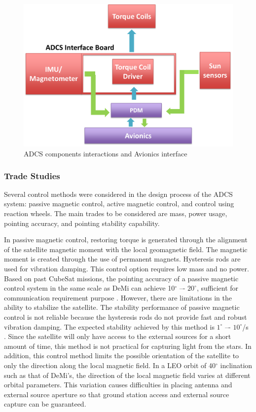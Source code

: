 \documentclass[12pt]{article}
\begin{document}
			\begin{figure}[!ht]
				\centering
				\includegraphics[scale=0.5]{images/ADCS_schem.png}
				\caption{ADCS components interactions and Avionics interface}
				\label{fig:ADCS_schem}
			\end{figure}
			\subsubsection{Trade Studies}
			Several control methods were considered in the design process of the ADCS system: passive magnetic control, active magnetic control, and control using reaction wheels. The main trades to be considered are mass, power usage, pointing accuracy, and pointing stability capability. 

In passive magnetic control, restoring torque is generated through the alignment of the satellite magnetic moment with the local geomagnetic field. The magnetic moment is created through the use of permanent magnets. Hysteresis rods are used for vibration damping. This control option requires low mass and no power. Based on past CubeSat missions, the pointing accuracy of a passive magnetic control system in the same scale as DeMi can achieve 10$^\circ$ –- $20 ^\circ$, sufficient for communication requirement purpose \cite{adcs_survey} \cite[p.~578]{SMAD}. However, there are limitations in the ability to stabilize the satellite. The stability performance of passive magnetic control is not reliable because the hysteresis rods do not provide fast and robust vibration damping. The expected stability achieved by this method is $1^\circ$ –- $10 ^\circ$/s \cite{adcs_survey}. Since the satellite will only have access to the external sources for a short amount of time, this method is not practical for capturing light from the stars. In addition, this control method limits the possible orientation of the satellite to only the direction along the local magnetic field. In a LEO orbit of 40$^\circ$ inclination such as that of DeMi’s, the direction of the local magnetic field varies at different orbital parameters. This variation causes difficulties in placing antenna and external source aperture so that ground station access and external source capture can be guaranteed. 
\end{document}
